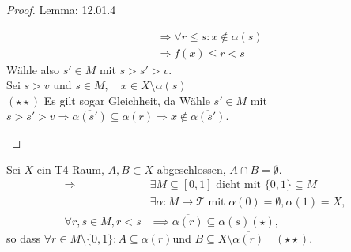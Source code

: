 \begin{proof}{Lemma: 12.01.4 }
\begin{itemize}
\begin{equation*}
\begin{split}
    &\Rightarrow \forall r \leq s: x \notin \alpha(s)\\
    & \Rightarrow f(x) \leq r < s
    \end{split}
 \end{equation*}
 Wähle also $s' \in M$ mit $s > s' > v$.\\
 Sei $s > v$ und $s \in M,\quad x\in X\setminus \alpha(s)$\\
 $(\star \star)$ Es gilt sogar Gleichheit, da Wähle $s' \in M$ mit $s > s' > v 
 \Rightarrow \overline{\alpha(s')} \subseteq \alpha(r) \Rightarrow x \notin \overline{\alpha(s')}$.
   \end{itemize}
\end{proof}

\mlenma{}
{
    Sei $X$ ein T4 Raum, $A,B \subset X$ abgeschlossen, $A \cap B = \emptyset$.
    \begin{equation*}
    \begin{split}
    \Rightarrow &\exists M \subseteq [0,1] \text{ dicht mit } \{0,1\} \subseteq M\\
    &\exists \alpha : M \to \mathcal{T} \text{ mit } \alpha(0) = \emptyset, \alpha(1) = X,\\
    \forall r,s \in M, r < s &\implies \overline{\alpha(r)} \subseteq \alpha(s) (\star),
    \end{split}
    \end{equation*}
    so dass $\forall r \in M\setminus \{0,1\}: A \subseteq \alpha(r) $und 
    $B \subseteq X\setminus \overline{\alpha(r)} \quad (\star \star)$.
}

